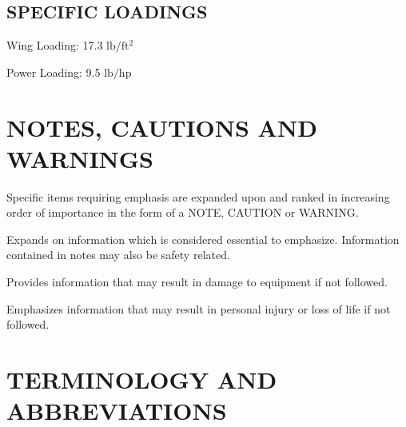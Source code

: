 \subsection{SPECIFIC LOADINGS} 
\begin{Description}
	\item[Wing Loading:]17.3 $\mathrm{lb/ft^{2}}$ 
	\item[Power Loading:]9.5 $\mathrm{lb/hp}$ 
\end{Description}

\section{NOTES, CAUTIONS AND WARNINGS} Specific items requiring emphasis are expanded upon and ranked in increasing order of importance in the form of a NOTE, CAUTION or WARNING.

\begin{Note}
  Expands on information which is considered essential to emphasize.  Information contained in notes may also be safety related.
\end{Note}

\begin{NoteCtr}[CAUTION]
  Provides information that may result in damage to equipment if not followed.
  \end{NoteCtr}

\begin{NoteCtr}[WARNING]
  Emphasizes information that may result in personal injury or loss of life if not followed.
  \end{NoteCtr}


\section{TERMINOLOGY AND ABBREVIATIONS} 

